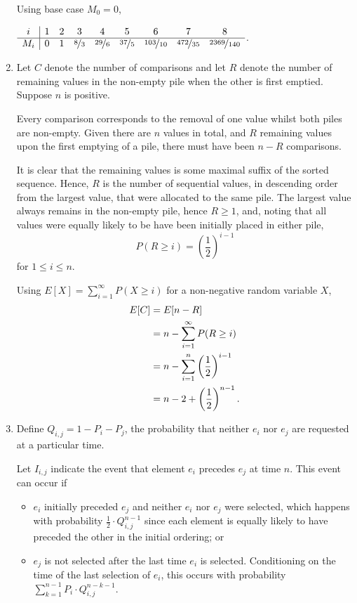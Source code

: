 \documentclass{article}
\begin{document}
\begin{enumerate}
    Using base case $M_0=0$,
    \begin{center}
    $\begin{array}{c|cccccccc}
        i & 1 & 2 & 3 & 4 & 5 & 6 & 7 & 8 \\
        \hline
        M_i & 0 & 1 & \nicefrac{8}{3} & \nicefrac{29}{6} & \nicefrac{37}{5} & \nicefrac{103}{10} & \nicefrac{472}{35} & \nicefrac{2369}{140} \\
    \end{array}$.
    \end{center}
\item
    Let $C$ denote the number of comparisons and
    let $R$ denote the number of remaining values in the non-empty pile when the other is first emptied.
    Suppose $n$ is positive.

    Every comparison corresponds to the removal of one value whilst both piles are non-empty.
    Given there are $n$ values in total, and $R$ remaining values upon the first emptying of a pile,
    there must have been $n-R$ comparisons.

    It is clear that the remaining values is some maximal suffix of the sorted sequence.
    Hence, $R$ is the number of sequential values, in descending order from the largest value, that were allocated to the same pile.
    The largest value always remains in the non-empty pile, hence $R \geq 1$, and, noting that all values were equally
    likely to be have been initially placed in either pile,
    \[ P(R \geq i) = \left(\frac{1}{2}\right)^{i-1} \]
    for $1 \leq i \leq n$.

    Using $E[X] = \sum_{i=1}^\infty P(X \geq i)$ for a non-negative random variable $X$,
    \[\begin{split}
    E[C]    & = E[n-R] \\
            & = n - \sum_{i=1}^\infty P(R \geq i) \\
            & = n - \sum_{i=1}^n \left(\frac{1}{2}\right)^{i-1} \\
            & = n - 2 + \left(\frac{1}{2}\right)^{n-1} \text.
    \end{split}\]
\item
    Define $Q_{i,j} = 1 - P_i - P_j$, the probability that neither $e_i$ nor $e_j$ are requested at a particular time.

    Let $I_{i,j}$ indicate the event that element $e_i$ precedes $e_j$ at time $n$.
    This event can occur if
    \begin{itemize}
    \item  $e_i$ initially preceded $e_j$ and neither $e_i$ nor $e_j$ were selected,
    which happens with probability $\frac{1}{2} \cdot Q_{i,j}^{n-1}$ since each element is equally likely
    to have preceded the other in the initial ordering; or
    \item $e_j$ is not selected after the last time $e_i$ is selected.
    Conditioning on the time of the last selection of $e_i$, this occurs with probability $\sum_{k=1}^{n-1} P_i \cdot Q_{i,j}^{n-k-1}$.
    \end{itemize}


\end{enumerate}
\end{document}

